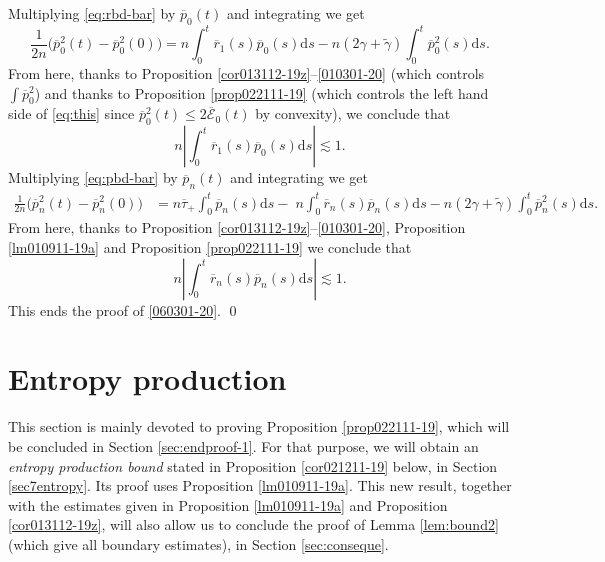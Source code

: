 \documentclass[EJP]{ejpecp} %
\newcommand{\dd  }{\mathrm{d}}
\renewcommand{\tilde}{\widetilde}
\renewcommand{\bar}{\overline}
\numberwithin{equation}{section}
\begin{document}
Multiplying \eqref{eq:rbd-bar} by $\bar p_0(t)$ and integrating we get
\begin{equation}\label{eq:this}
 \frac{1}{2n}\big(\bar   p^2_0(t)-\bar   p^2_0(0)\big) =   n\int_0^t\bar r_1(s)  \bar   p_0(s)\dd s                                            
      -  n(2\gamma+\tilde \gamma) \int_0^t \bar   p_0^2(s)\dd s.
\end{equation}
From here, thanks to Proposition \ref{cor013112-19z}--\eqref{010301-20} (which controls $\int \bar p_0^2$) and thanks to Proposition \ref{prop022111-19} (which controls the left hand side of \eqref{eq:this} since $\bar p_0^2(t) \leqslant 2\bar{\mathcal{E}}_0(t)$ by convexity),  we conclude that
$$
n\left|\int_0^t\bar r_1(s)  \bar   p_0(s)\dd s  \right|\lesssim 1.
$$
Multiplying \eqref{eq:pbd-bar} by $\bar p_n(t)$ and integrating we get
\begin{align*}
 \frac{1}{2n} \big( \bar   p^2_n(t)-\bar   p^2_n(0)\big) &= n\bar \tau_+\int_0^t  \bar   p_n(s)\dd s      -\;  n\int_0^t\bar r_n(s)  \bar   p_n(s)\dd s                                            
      -  n(2\gamma+\tilde \gamma) \int_0^t \bar   p_n^2(s)\dd s.
\end{align*}
From here, thanks to Proposition \ref{cor013112-19z}--\eqref{010301-20}, Proposition \ref{lm010911-19a}  and Proposition \ref{prop022111-19} we conclude that
$$
n\left|\int_0^t\bar r_n(s)  \bar   p_n(s)\dd s  \right|\lesssim 1.
$$
 This ends the proof of \eqref{060301-20}.
\qed













\section{Entropy production}

\label{sec6}

This section is mainly devoted to proving Proposition \ref{prop022111-19}, which will be concluded in Section \ref{sec:endproof-1}. For that purpose, we will obtain an \emph{entropy production bound} stated in Proposition \ref{cor021211-19} below, in Section \ref{sec7entropy}. Its proof uses Proposition \ref{lm010911-19a}. This new result, together with the estimates given in Proposition \ref{lm010911-19a} and Proposition \ref{cor013112-19z}, will also allow us to conclude the proof of Lemma  \ref{lem:bound2} (which give all boundary estimates), in Section \ref{sec:conseque}. 
\end{document}
